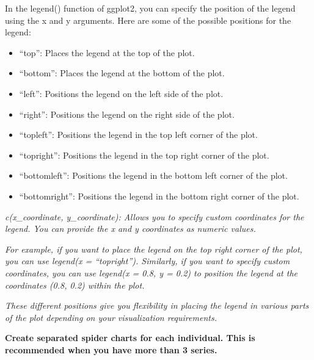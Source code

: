 \documentclass[
]{article}
\providecommand{\tightlist}{%
  \setlength{\itemsep}{0pt}\setlength{\parskip}{0pt}}
\begin{document}
In the legend() function of ggplot2, you can specify the position of the
legend using the x and y arguments. Here are some of the possible
positions for the legend:

\begin{itemize}
\tightlist
\item
  ``top'': Places the legend at the top of the plot.
\item
  ``bottom'': Places the legend at the bottom of the plot.
\item
  ``left'': Positions the legend on the left side of the plot.
\item
  ``right'': Positions the legend on the right side of the plot.
\item
  ``topleft'': Positions the legend in the top left corner of the plot.
\item
  ``topright'': Positions the legend in the top right corner of the
  plot.
\item
  ``bottomleft'': Positions the legend in the bottom left corner of the
  plot.
\item
  ``bottomright'': Positions the legend in the bottom right corner of
  the plot.
\end{itemize}

\emph{c(x\_coordinate, y\_coordinate): Allows you to specify custom
coordinates for the legend. You can provide the x and y coordinates as
numeric values.}

\emph{For example, if you want to place the legend on the top right
corner of the plot, you can use legend(x = ``topright''). Similarly, if
you want to specify custom coordinates, you can use legend(x = 0.8, y =
0.2) to position the legend at the coordinates (0.8, 0.2) within the
plot.}

\emph{These different positions give you flexibility in placing the
legend in various parts of the plot depending on your visualization
requirements.}

\textbf{Create separated spider charts for each individual. This is
recommended when you have more than 3 series.}
\end{document}
